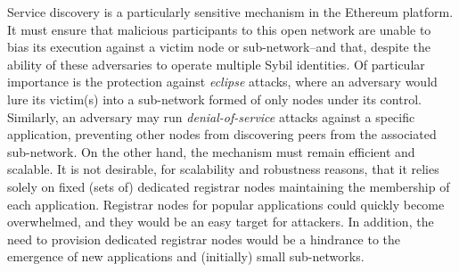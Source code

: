 Service discovery is a particularly sensitive mechanism in the Ethereum platform.
It must ensure that malicious participants to this open network are unable to bias its execution against a victim node or sub-network--and that, despite the ability of these adversaries to operate multiple Sybil identities.
Of particular importance is the protection against \emph{eclipse} attacks, where an adversary would lure its victim(s) into a sub-network formed of only nodes under its control.
Similarly, an adversary may run \emph{denial-of-service} attacks against a specific application, preventing other nodes from discovering peers from the associated sub-network.
On the other hand, the mechanism must remain efficient and scalable.
It is not desirable, for scalability and robustness reasons, that it relies solely on fixed (sets of) dedicated registrar nodes maintaining the membership of each application.
Registrar nodes for popular applications could quickly become overwhelmed, and they would be an easy target for attackers.
In addition, the need to provision dedicated registrar nodes would be a hindrance to the emergence of new applications and (initially) small sub-networks.


